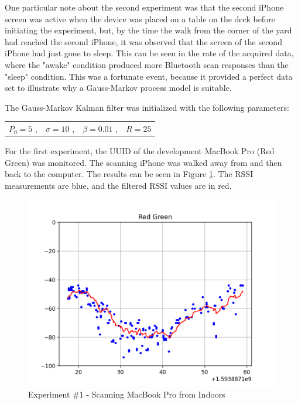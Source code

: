 \documentclass[12pt]{article}
\begin{document}
One particular note about the second experiment was that the second iPhone screen was
active when the device was placed on a table on the deck before initiating the experiment,
but, by the time the walk from the corner of the yard had reached the second iPhone, it was
observed that the screen of the second iPhone had just gone to sleep. This can be seen in
the rate of the acquired data, where the "awake" condition produced more Bluetooth scan
responses than the "sleep" condition. This was a fortunate event, because it provided a
perfect data set to illustrate why a Gauss-Markov process model is suitable.

The Gauss-Markov Kalman filter was initialized with the following parameters:

\begin{center}
    \begin{tabular}{cccc}
        $P_0 = 5$ ,
        &
        $\sigma = 10$ ,
        &
        $\beta = 0.01$ ,
        &
        $R = 25$
    \end{tabular}
\end{center}

For the first experiment, the UUID of the development MacBook Pro (Red Green) was
monitored. The scanning iPhone was walked away from and then back to the computer. The
results can be seen in Figure \ref{fig:experiment-1-mbp}. The RSSI measurements are blue,
and the filtered RSSI values are in red.

\begin{figure}[ht]
    \centering
    \includegraphics[width=1.0\textwidth]{Experiment-1-MBP-GM.png}
    \caption{Experiment \#1 - Scanning MacBook Pro from Indoors}
    \label{fig:experiment-1-mbp}
\end{figure}
\end{document}

